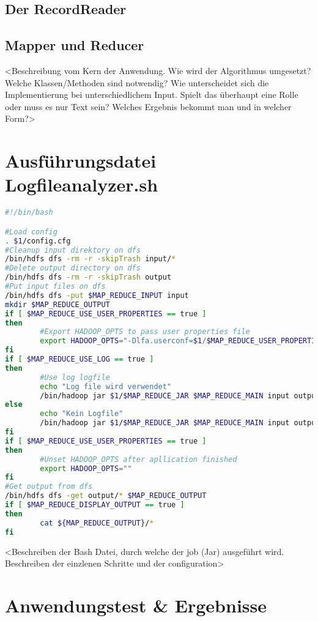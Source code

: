 \subsection{Der RecordReader}


\subsection{Mapper und Reducer}

<Beschreibung vom Kern der Anwendung. Wie wird der Algorithmus umgesetzt? Welche Klassen/Methoden sind notwendig? Wie unterscheidet sich die Implementierung bei unterschiedlichem Input. Spielt das überhaupt eine Rolle oder muss es nur Text sein? Welches Ergebnis bekommt man und in welcher Form?>

\section{Ausführungsdatei Logfileanalyzer.sh}

\begin{lstlisting}[language=Bash,caption=Ausführungsdatei Logfileanalyzer.sh,label=lis:Logfileanalyzer.sh]
#!/bin/bash

#Load config
. $1/config.cfg
#Cleanup input direktory on dfs
/bin/hdfs dfs -rm -r -skipTrash input/*
#Delete output directory on dfs
/bin/hdfs dfs -rm -r -skipTrash output
#Put input files on dfs
/bin/hdfs dfs -put $MAP_REDUCE_INPUT input
mkdir $MAP_REDUCE_OUTPUT
if [ $MAP_REDUCE_USE_USER_PROPERTIES == true ]
then
        #Export HADOOP_OPTS to pass user properties file
        export HADOOP_OPTS="-Dlfa.userconf=$1/$MAP_REDUCE_USER_PROPERTIES"
fi
if [ $MAP_REDUCE_USE_LOG == true ]
then
        #Use log logfile
        echo "Log file wird verwendet"
        /bin/hadoop jar $1/$MAP_REDUCE_JAR $MAP_REDUCE_MAIN input output 2> $MAP_REDUCE_LOGFILE
else
        echo "Kein Logfile"
        /bin/hadoop jar $1/$MAP_REDUCE_JAR $MAP_REDUCE_MAIN input output
fi
if [ $MAP_REDUCE_USE_USER_PROPERTIES == true ]
then
        #Unset HADOOP_OPTS after apllication finished
        export HADOOP_OPTS=""
fi
#Get output from dfs
/bin/hdfs dfs -get output/* $MAP_REDUCE_OUTPUT
if [ $MAP_REDUCE_DISPLAY_OUTPUT == true ]
then
        cat ${MAP_REDUCE_OUTPUT}/*
fi
\end{lstlisting}

<Beschreiben der Bash Datei, durch welche der job (Jar) ausgeführt wird. Beschreiben der einzlenen Schritte und der configuration>

\section{Anwendungstest \& Ergebnisse}

